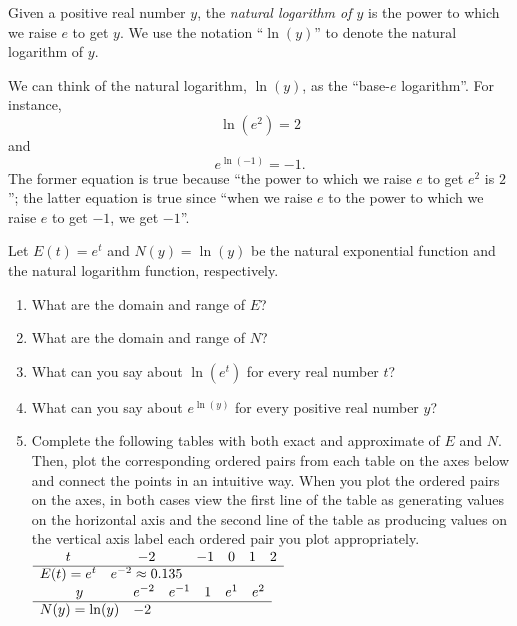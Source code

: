\documentclass[nooutcomes]{ximera}
\begin{document}
Given a positive real number \(y\), the \emph{natural logarithm of \(y\)} is the power to which we raise \(e\) to get \(y\).  We use the notation ``\(\ln(y)\)'' to denote the natural logarithm of \(y\).%

We can think of the natural logarithm, \(\ln(y)\), as the ``base-\(e\) logarithm''.  For instance,%
\begin{equation*}
\ln(e^2) = 2
\end{equation*}
and%
\begin{equation*}
e^{\ln(-1)} = -1\text{.}
\end{equation*}
The former equation is true because ``the power to which we raise \(e\) to get \(e^2\) is \(2\)''; the latter equation is true since ``when we raise \(e\) to the power to which we raise \(e\) to get \(-1\), we get \(-1\)''.
\begin{exploration}
Let \(E(t) = e^t\) and \(N(y) = \ln(y)\) be the natural exponential function and the natural logarithm function, respectively.%

\begin{enumerate}[label=\alph*.]
\item
What are the domain and range of \(E\)?%
\item
What are the domain and range of \(N\)?%
\item
What can you say about \(\ln(e^t)\) for every real number \(t\)?%
\item
What can you say about \(e^{\ln(y)}\) for every positive real number \(y\)?%
\item
Complete the following tables with both exact and approximate of \(E\) and \(N\).  Then, plot the corresponding ordered pairs from each table on the axes below and connect the points in an intuitive way.  When you plot the ordered pairs on the axes, in both cases view the first line of the table as generating values on the horizontal axis and the second line of the table as producing values on the vertical axis label each ordered pair you plot appropriately.%
%
\\
$
\begin{array}{llllll}
\multicolumn{1}{c}{t}&\multicolumn{1}{c}{-2}&\multicolumn{1}{c}{-1}&\multicolumn{1}{c}{0}&\multicolumn{1}{c}{1}&\multicolumn{1}{c}{2}\\
\hline
E(t)=e^t&e^{-2} \approx 0.135&&&&
\end{array}
$
\\
$
\begin{array}{llllll}
\multicolumn{1}{c}{y}&\multicolumn{1}{c}{e^{-2}}&\multicolumn{1}{c}{e^{-1}}&\multicolumn{1}{c}{1}&\multicolumn{1}{c}{e^1}&\multicolumn{1}{c}{e^2}\\
\hline
N(y)=\ln(y)&-2&&&&
\end{array}
$
%


\end{enumerate}
\end{exploration}
\end{document}
